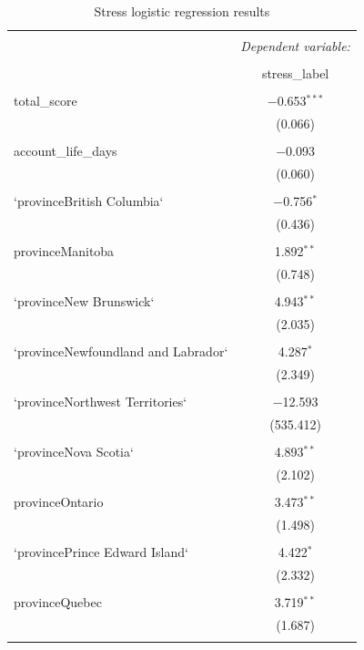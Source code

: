 \documentclass{article}
\begin{document}
\begin{longtable}{@{\extracolsep{10pt}}lc} 
  \caption{Stress logistic regression results} 
  \label{Stress logistic regression results} 
\\[-1.8ex]\hline 
\hline \\[-1.8ex] 
 & \multicolumn{1}{c}{\textit{Dependent variable:}} \\ 
\cline{2-2} 
\\[-1.8ex] & stress\_label \\ 
\hline \\[-1.8ex] 
 total\_score & $-$0.653$^{***}$ \\ 
  & (0.066) \\ 
  & \\ 
 account\_life\_days & $-$0.093 \\ 
  & (0.060) \\ 
  & \\ 
 `provinceBritish Columbia` & $-$0.756$^{*}$ \\ 
  & (0.436) \\ 
  & \\ 
 provinceManitoba & 1.892$^{**}$ \\ 
  & (0.748) \\ 
  & \\ 
 `provinceNew Brunswick` & 4.943$^{**}$ \\ 
  & (2.035) \\ 
  & \\ 
 `provinceNewfoundland and Labrador` & 4.287$^{*}$ \\ 
  & (2.349) \\ 
  & \\ 
 `provinceNorthwest Territories` & $-$12.593 \\ 
  & (535.412) \\ 
  & \\ 
 `provinceNova Scotia` & 4.893$^{**}$ \\ 
  & (2.102) \\ 
  & \\ 
 provinceOntario & 3.473$^{**}$ \\ 
  & (1.498) \\ 
  & \\ 
 `provincePrince Edward Island` & 4.422$^{*}$ \\ 
  & (2.332) \\ 
  & \\ 
 provinceQuebec & 3.719$^{**}$ \\ 
  & (1.687) \\ 
  & \\ 

\end{longtable}
\end{document}
